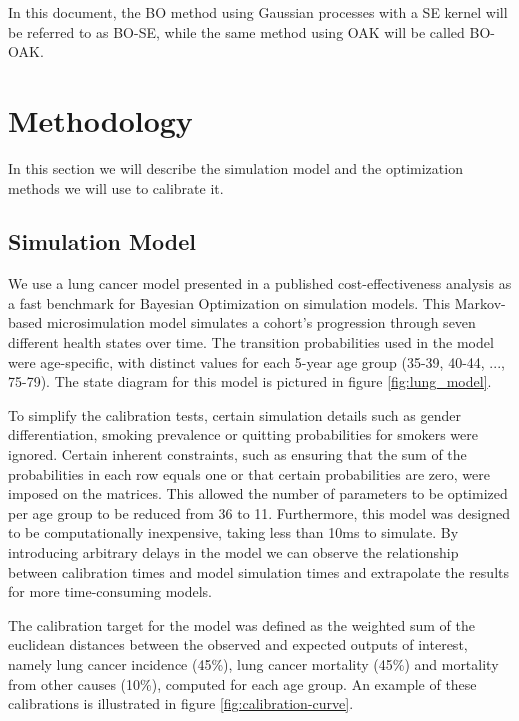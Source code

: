 \documentclass[sn-mathphys,Numbered]{sn-jnl}%
\begin{document}
In this document, the BO method using Gaussian processes with a SE kernel will be referred to as BO-SE, while the same method using OAK will be called BO-OAK.

\section{Methodology}
In this section we will describe the simulation model and the optimization methods we will use to calibrate it.

\subsection{Simulation Model}
\label{sec:simulation-model}
We use a lung cancer model presented in a published cost-effectiveness analysis\cite{lung-model} as a fast benchmark for Bayesian Optimization on simulation models. This Markov-based microsimulation model simulates a cohort's progression through seven different health states over time. The transition probabilities used in the model were age-specific, with distinct values for each 5-year age group (35-39, 40-44, ..., 75-79). The state diagram for this model is pictured in figure \ref{fig:lung_model}.

To simplify the calibration tests, certain simulation details such as gender differentiation, smoking prevalence or quitting probabilities for smokers were ignored. Certain inherent constraints, such as ensuring that the sum of the probabilities in each row equals one or that certain probabilities are zero, were imposed on the matrices. This allowed the number of parameters to be optimized per age group to be reduced from 36 to 11. Furthermore, this model was designed to be computationally inexpensive, taking less than 10ms to simulate. By introducing arbitrary delays in the model we can observe the relationship between calibration times and model simulation times and extrapolate the results for more time-consuming models.

The calibration target for the model was defined as the weighted sum of the euclidean distances between the observed and expected outputs of interest, namely lung cancer incidence (45\%), lung cancer mortality (45\%) and mortality from other causes (10\%), computed for each age group. An example of these calibrations is illustrated in figure \ref{fig:calibration-curve}.
\end{document}

